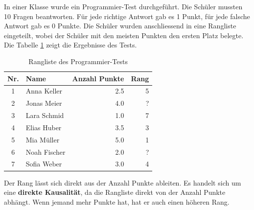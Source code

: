 \begin{myexercise}
    In einer Klasse wurde ein Programmier-Test durchgeführt. Die Schüler mussten 10 Fragen beantworten. Für jede richtige Antwort gab es 1 Punkt, für jede falsche Antwort gab es 0 Punkte. Die Schüler wurden anschliessend in eine Rangliste eingeteilt, wobei der Schüler mit den meisten Punkten den ersten Platz belegte. Die Tabelle \ref{tab:rangliste} zeigt die Ergebnisse des Tests.
    \begin{table}[H]
        \centering
        \begin{tabular}{clrr}
            \midrule
            Nr. & Name         & Anzahl Punkte & Rang \\
            \midrule
            1   & Anna Keller  & 2.5           & 5    \\
            2   & Jonas Meier  & 4.0           & ?    \\
            3   & Lara Schmid  & 1.0           & 7    \\
            4   & Elias Huber  & 3.5           & 3    \\
            5   & Mia Müller   & 5.0           & 1    \\
            6   & Noah Fischer & 2.0           & ?    \\
            7   & Sofia Weber  & 3.0           & 4    \\
            \midrule
        \end{tabular}
        \caption{Rangliste des Programmier-Tests}
        \label{tab:rangliste}
    \end{table}
    \begin{myanswer}
        Der Rang lässt sich direkt aus der Anzahl Punkte ableiten. Es handelt sich um eine \textbf{direkte Kausalität}, da die Rangliste direkt von der Anzahl Punkte abhängt. Wenn jemand mehr Punkte hat, hat er auch einen höheren Rang.
    \end{myanswer}
\end{myexercise}

